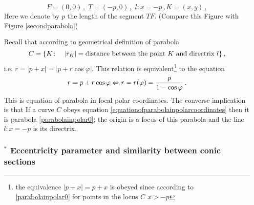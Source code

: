 \documentclass[12pt]{article}
\numberwithin{equation}{section}
\begin{document}
\begin{equation}\label{fourthparabola}
F=\left(0,0\right)\,,\,\, 
T=\left(-p,0\right)\,,\,\, 
l\colon x=-p\,, K=(x,y)\,,
      \end{equation}
Here  we denote by $p$ the length of the segment $TF$.
(Compare this Figure with Figure \eqref{secondparabola})

Recall that according to geometrical definition of parabola
\begin{equation}\label{parabolainpolar0}
    C=\{K\colon\quad |r_K|=\hbox {distance between the point
             $K$ and directrix $l$}\}\,,
       \end{equation}
i.e. $r=|p+x|=|p+r\cos\varphi|$.
This relation is equivalent\footnote{the equivalence 
$|p+x|=p+x$ is obeyed since according
to \eqref{parabolainpolar0} for points in the locus $C$ $x>-p$} to
the equation
           \begin{equation}
\label{equationofparabolainpolarcoordinates}
r=p+r\cos\varphi \Leftrightarrow r=r(\varphi)=
      {p\over 1-\cos\varphi}\,.
       \end{equation}
This is equation of parabola in focal polar coordinates.
The converse implication is that If a curve $C$ obeys
equation \eqref{equationofparabolainpolarcoordinates}
then it is parabola
\eqref{parabolainpolar0}; the origin is a focus of this parabola
and the line $l\colon x=-p$ is its directrix.


\subsubsection { $^*$ Eccentricity parameter and similarity
between conic sections }\label{eccentricityparameter}
\end{document}
